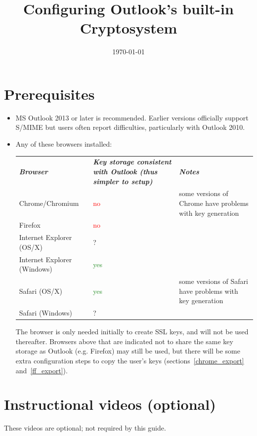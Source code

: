 \documentclass[pdftex,12pt,titlepage=false]{scrartcl}
\title{\rmfamily Configuring Outlook's built-in Cryptosystem}
\date{\rmfamily\today}
\newcommand{\yesgood}{\textcolor{ForestGreen}{yes}}
\newcommand{\nobad}{\textcolor{red}{no}}
\begin{document}
\maketitle

\tableofcontents

\section{Prerequisites}
\begin{itemize}
\item MS Outlook 2013 or later is recommended.  Earlier versions
  officially support S/MIME but users often report difficulties,
  particularly with Outlook 2010.
\item Any of these browsers installed:

  \begin{tabular}{lp{65mm}p{}}
    \textsl{\textbf{Browser}}        & \textsl{\textbf{Key storage consistent with Outlook (thus simpler to setup)}} & \textsl{\textbf{Notes}}\\
    Chrome/Chromium                  & \nobad   & some versions of Chrome have problems with key generation\\
    Firefox                          & \nobad   &\\
    Internet Explorer \tiny(OS/X)    & ?        &\\
    Internet Explorer \tiny(Windows) & \yesgood &\\
    Safari \tiny(OS/X)               & \yesgood & some versions of Safari have problems with key generation\\
    Safari \tiny(Windows)            & ?        &\\
  \end{tabular}

  The browser is only needed initially to create SSL keys, and will
  not be used thereafter.  Browsers above that are indicated not to
  share the same key storage as Outlook (e.g. Firefox) may still be
  used, but there will be some extra configuration steps to copy the
  user's keys (sections~\ref{chrome_export} and~\ref{ff_export}).
\end{itemize}

\section{Instructional videos (optional)}
These videos are optional; not required by this guide.
\end{document}
